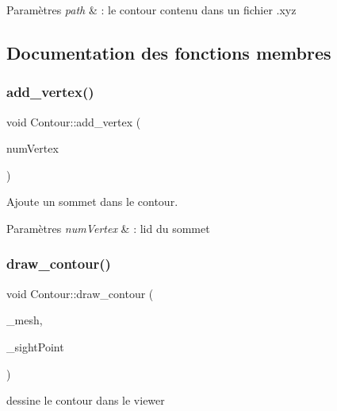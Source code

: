 \begin{DoxyParams}{Paramètres}
{\em path} & \+: le contour contenu dans un fichier .xyz \\
\hline
\end{DoxyParams}


\subsection{Documentation des fonctions membres}
\mbox{\label{classContour_a2b6191371b3ba0cd72e4c26da74e9b58}} 
\subsubsection{\texorpdfstring{add\+\_\+vertex()}{add\_vertex()}}
{\footnotesize\ttfamily void Contour\+::add\+\_\+vertex (\begin{DoxyParamCaption}\item[{unsigned}]{num\+Vertex }\end{DoxyParamCaption})}



Ajoute un sommet dans le contour. 


\begin{DoxyParams}{Paramètres}
{\em num\+Vertex} & \+: l\textquotesingle{}id du sommet \\
\hline
\end{DoxyParams}
\mbox{\label{classContour_ad5d4922909fd2dab2c660a85dc339df1}} 
\subsubsection{\texorpdfstring{draw\+\_\+contour()}{draw\_contour()}}
{\footnotesize\ttfamily void Contour\+::draw\+\_\+contour (\begin{DoxyParamCaption}\item[{My\+Mesh $\ast$}]{\+\_\+mesh,  }\item[{My\+Mesh\+::\+Point}]{\+\_\+sight\+Point }\end{DoxyParamCaption})}



dessine le contour dans le viewer 


